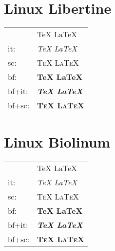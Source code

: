 \documentclass{article}
\newcommand\testlogos[1]{%
  \begingroup
    #1%
    \TeX{}
    \LaTeX{}
    \LaTeXe{}
    \pdfLaTeX{}
    \XeTeX{}
    \XeLaTeX{}
    \LuaTeX{}
    \LuaLaTeX
  \endgroup
}
\newcommand\test[1]{%
  \begingroup
    #1%
    \begin{tabular}{ll}
           & \testlogos{} \\
    it:    & \testlogos{\itshape}\\
    sc:    & \testlogos{\scshape}\\
    bf:    & \testlogos{\bfseries}\\
    bf+it: & \testlogos{\bfseries\itshape}\\
    bf+sc: & \testlogos{\bfseries\scshape}
    \end{tabular}
  \endgroup
}
\begin{document}
\Large

\section{Linux Libertine}
\test{}

\section{Linux Biolinum}
\test{\sffamily}
\end{document}

